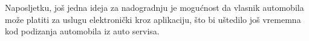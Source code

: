 		Naposljetku, još jedna ideja za nadogradnju je mogućnost da vlasnik automobila može platiti za uslugu elektronički kroz aplikaciju, što bi uštedilo još vrememna kod podizanja automobila iz auto servisa.\\
		\eject
		
%		
%
%		
%
%
%		
%		
%				
%			
%				
%			
%		
%		
%		
%			
